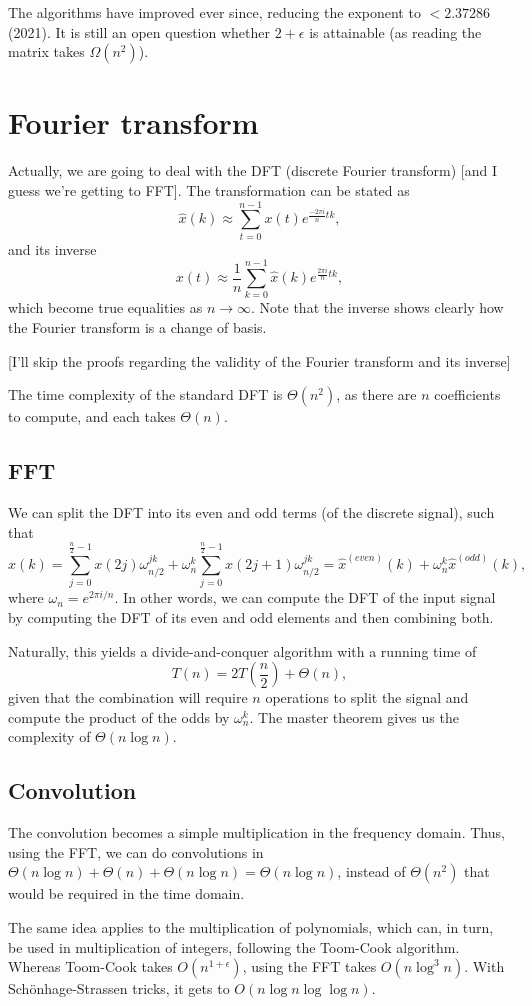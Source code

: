 The algorithms have improved ever since, reducing the exponent to $<2.37286$ (2021).
It is still an open question whether $2+\epsilon$ is attainable (as reading the matrix takes $\Omega(n^2)$).


\section*{Fourier transform}

Actually, we are going to deal with the DFT (discrete Fourier transform) [and I guess we're getting to FFT].
The transformation can be stated as \[
\hat{x}(k) \approx \sum_{t=0}^{n-1} x(t) e^{\frac{-2\pi i}{n} t k}
,\] and its inverse \[
x(t) \approx \frac{1}{n} \sum_{k=0}^{n-1} \hat{x}(k) e^{\frac{2\pi i}{n} tk}
,\] which become true equalities as $n\to \infty$.
Note that the inverse shows clearly how the Fourier transform is a change of basis.

[I'll skip the proofs regarding the validity of the Fourier transform and its inverse]

The time complexity of the standard DFT is $\Theta(n^2)$, as there are $n$ coefficients to compute, and each takes $\Theta(n)$.

\subsection*{FFT}

We can split the DFT into its even and odd terms (of the discrete signal), such that \[
\hat{x}(k) = \sum_{j=0}^{\frac{n}{2}-1} x(2j)\omega_{n / 2}^{jk} + \omega_n^{k} \sum_{j=0}^{\frac{n}{2}-1} x(2j+1)\omega_{n / 2}^{jk} = \hat{x}^{(even)}(k) + \omega_n^{k}\hat{x}^{(odd)}(k)
,\] where $\omega_n = e^{2\pi i / n}$.
In other words, we can compute the DFT of the input signal by computing the DFT of its even and odd elements and then combining both.

Naturally, this yields a divide-and-conquer algorithm with a running time of \[
T(n) = 2T(\frac{n}{2}) + \Theta(n)
,\] given that the combination will require $n$ operations to split the signal and compute the product of the odds by $\omega_n^{k}$.
The master theorem gives us the complexity of $\Theta(n \log n)$.

\subsection*{Convolution}

The convolution becomes a simple multiplication in the frequency domain.
Thus, using the FFT, we can do convolutions in $\Theta(n \log n) + \Theta(n) + \Theta(n \log n) = \Theta(n \log n)$, instead of $\Theta(n^2)$ that would be required in the time domain.

The same idea applies to the multiplication of polynomials, which can, in turn, be used in multiplication of integers, following the Toom-Cook algorithm.
Whereas Toom-Cook takes $O(n^{1+\epsilon})$, using the FFT takes $O(n \log^{3} n)$.
With Schönhage-Strassen tricks, it gets to $O(n \log n \log \log n)$.



